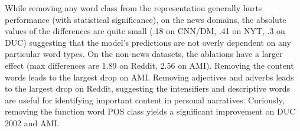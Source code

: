 While removing any word class from the representation generally hurts %
performance (with statistical significance), on the news domains,
the absolute values of the differences are quite small 
(.18 on CNN/DM, .41 on NYT, .3 on DUC) suggesting that the model's predictions
are not overly dependent on any particular word types. 
On the non-news datasets, the ablations have a larger effect 
(max differences are 1.89 on Reddit, 2.56 on AMI). 
Removing the content words leads to the largest drop on AMI.
Removing adjectives and adverbs leads to the largest drop on Reddit,
suggesting the intensifiers and descriptive words are useful for 
identifying important content in personal narratives.
Curiously, 
removing the function word POS class yields a significant improvement
on DUC 2002 and AMI.%




